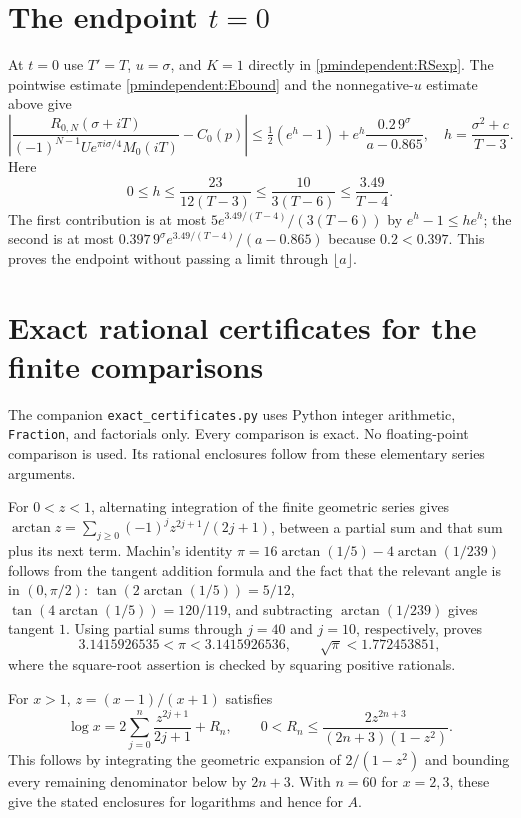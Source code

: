 \section{The endpoint $t=0$}

At $t=0$ use $T'=T$, $u=\sigma$, and $K=1$ directly in
\eqref{pmindependent:RSexp}. The pointwise estimate \eqref{pmindependent:Ebound} and the
nonnegative-$u$ estimate above give
\[
 \left|\frac{R_{0,N}(\sigma+iT)}
 {(-1)^{N-1}Ue^{\pi i\sigma/4}M_0(iT)}-C_0(p)\right|
 \le\tfrac12(e^h-1)+e^h\frac{0.2\,9^\sigma}{a-0.865},
 \quad h=\frac{\sigma^2+c}{T-3}.
\]
Here
\[
 0\le h\le\frac{23}{12(T-3)}
 \le\frac{10}{3(T-6)}\le\frac{3.49}{T-4}.
\]
The first contribution is at most
$5e^{3.49/(T-4)}/(3(T-6))$ by $e^h-1\le he^h$;
the second is at most
$0.397\,9^\sigma e^{3.49/(T-4)}/(a-0.865)$ because $0.2<0.397$.
This proves the endpoint without passing a limit through $\lfloor a\rfloor$.

\section{Exact rational certificates for the finite comparisons}

The companion \texttt{exact\_certificates.py} uses Python integer
arithmetic, \texttt{Fraction}, and factorials only. Every comparison
is exact. No floating-point comparison is used. Its rational
enclosures follow from these elementary series arguments.

For $0<z<1$, alternating integration of the finite geometric series
gives
$\arctan z=\sum_{j\ge0}(-1)^jz^{2j+1}/(2j+1)$,
between a partial sum and that sum plus its next term. Machin's
identity $\pi=16\arctan(1/5)-4\arctan(1/239)$ follows from
the tangent addition formula and the fact that the relevant angle
is in $(0,\pi/2)$: $\tan(2\arctan(1/5))=5/12$,
$\tan(4\arctan(1/5))=120/119$, and subtracting
$\arctan(1/239)$ gives tangent $1$. Using partial sums through
$j=40$ and $j=10$, respectively, proves
\[
 3.1415926535<\pi<3.1415926536,
 \qquad \sqrt\pi<1.772453851,
\]
where the square-root assertion is checked by squaring positive
rationals.

For $x>1$, $z=(x-1)/(x+1)$ satisfies
\[
 \log x=2\sum_{j=0}^n\frac{z^{2j+1}}{2j+1}+R_n,
 \qquad 0<R_n\le\frac{2z^{2n+3}}{(2n+3)(1-z^2)}.
\]
This follows by integrating the geometric expansion of
$2/(1-z^2)$ and bounding every remaining denominator below by
$2n+3$. With $n=60$ for $x=2,3$, these give the stated enclosures
for logarithms and hence for $A$.

